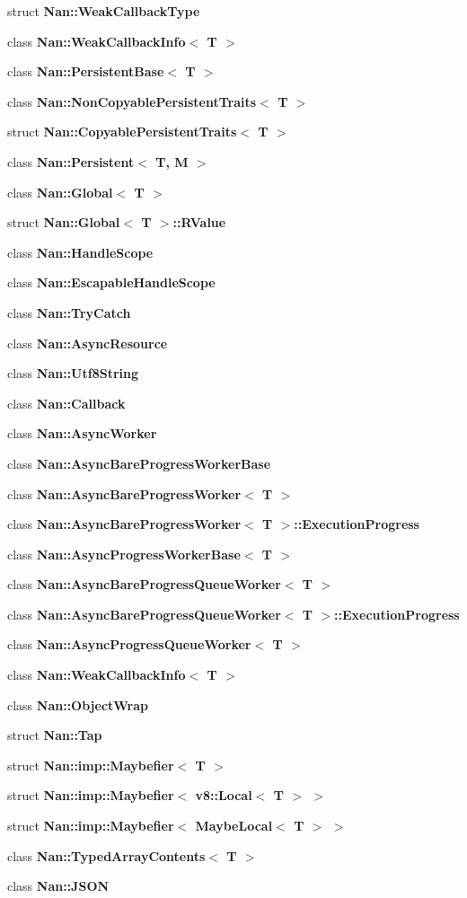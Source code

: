 \begin{DoxyCompactItemize}
\item 
struct \textbf{ Nan\+::\+Weak\+Callback\+Type}
\item 
class \textbf{ Nan\+::\+Weak\+Callback\+Info$<$ T $>$}
\item 
class \textbf{ Nan\+::\+Persistent\+Base$<$ T $>$}
\item 
class \textbf{ Nan\+::\+Non\+Copyable\+Persistent\+Traits$<$ T $>$}
\item 
struct \textbf{ Nan\+::\+Copyable\+Persistent\+Traits$<$ T $>$}
\item 
class \textbf{ Nan\+::\+Persistent$<$ T, M $>$}
\item 
class \textbf{ Nan\+::\+Global$<$ T $>$}
\item 
struct \textbf{ Nan\+::\+Global$<$ T $>$\+::\+R\+Value}
\item 
class \textbf{ Nan\+::\+Handle\+Scope}
\item 
class \textbf{ Nan\+::\+Escapable\+Handle\+Scope}
\item 
class \textbf{ Nan\+::\+Try\+Catch}
\item 
class \textbf{ Nan\+::\+Async\+Resource}
\item 
class \textbf{ Nan\+::\+Utf8\+String}
\item 
class \textbf{ Nan\+::\+Callback}
\item 
class \textbf{ Nan\+::\+Async\+Worker}
\item 
class \textbf{ Nan\+::\+Async\+Bare\+Progress\+Worker\+Base}
\item 
class \textbf{ Nan\+::\+Async\+Bare\+Progress\+Worker$<$ T $>$}
\item 
class \textbf{ Nan\+::\+Async\+Bare\+Progress\+Worker$<$ T $>$\+::\+Execution\+Progress}
\item 
class \textbf{ Nan\+::\+Async\+Progress\+Worker\+Base$<$ T $>$}
\item 
class \textbf{ Nan\+::\+Async\+Bare\+Progress\+Queue\+Worker$<$ T $>$}
\item 
class \textbf{ Nan\+::\+Async\+Bare\+Progress\+Queue\+Worker$<$ T $>$\+::\+Execution\+Progress}
\item 
class \textbf{ Nan\+::\+Async\+Progress\+Queue\+Worker$<$ T $>$}
\item 
class \textbf{ Nan\+::\+Weak\+Callback\+Info$<$ T $>$}
\item 
class \textbf{ Nan\+::\+Object\+Wrap}
\item 
struct \textbf{ Nan\+::\+Tap}
\item 
struct \textbf{ Nan\+::imp\+::\+Maybefier$<$ T $>$}
\item 
struct \textbf{ Nan\+::imp\+::\+Maybefier$<$ v8\+::\+Local$<$ T $>$ $>$}
\item 
struct \textbf{ Nan\+::imp\+::\+Maybefier$<$ Maybe\+Local$<$ T $>$ $>$}
\item 
class \textbf{ Nan\+::\+Typed\+Array\+Contents$<$ T $>$}
\item 
class \textbf{ Nan\+::\+J\+S\+ON}
\end{DoxyCompactItemize}
